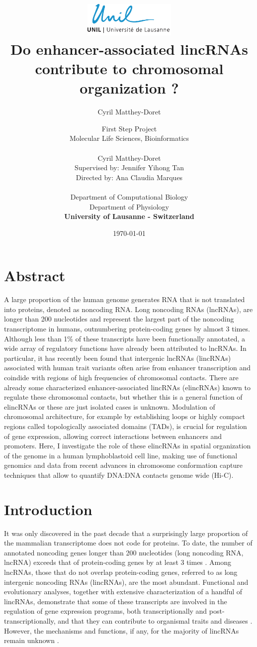 \documentclass[11pt,a4paper]{report}
\author{Cyril Matthey-Doret}
\title{
\includegraphics[width=1.75in]{lo_unil06_bleu.pdf} \\
\vspace*{1in}
\textbf{Do enhancer-associated lincRNAs contribute to chromosomal organization ?}}
\author{\Large{First Step Project}\\
		Molecular Life Sciences, Bioinformatics\\
				\vspace*{0.5in} \\
		Cyril Matthey-Doret\\
        Supervised by: Jennifer Yihong Tan\\
        Directed by: Ana Claudia Marques\\
		\vspace*{0.5in} \\
		Department of Computational Biology\\
		Department of Physiology\\
        \textbf{University of Lausanne - Switzerland}\\
       } \date{\today}
\begin{document}
\renewcommand{\headrulewidth}{1pt}
\maketitle

\section*{Abstract}

A large proportion of the human genome generates RNA that is not translated into proteins, denoted as noncoding RNA. Long noncoding RNAs (lncRNAs), are longer than 200 nucleotides and represent the largest part of the noncoding transcriptome in humans, outnumbering protein-coding genes by almost 3 times. Although less than 1\% of these transcripts have been functionally annotated, a wide array of regulatory functions have already been attributed to lncRNAs. In particular, it has recently been found that intergenic lncRNAs (lincRNAs) associated with human trait variants often arise from enhancer transcription and coindide with regions of high frequencies of chromosomal contacts. There are already some characterized enhancer-associated lincRNAs (elincRNAs) known to regulate these chromosomal contacts, but whether this is a general function of elincRNAs or these are just isolated cases is unknown. Modulation of chromosomal architecture, for example by establishing loops or highly compact regions called topologically associated domains (TADs), is crucial for regulation of gene expression, allowing correct interactions between enhancers and promoters. Here, I investigate the role of these elincRNAs in spatial organization of the genome in a human lymphoblastoid cell line, making use of functional genomics and data from recent advances in chromosome conformation capture techniques that allow to quantify DNA:DNA contacts genome wide (Hi-C).

\section*{Introduction}
It was only discovered in the past decade that a surprisingly large proportion of the mammalian transcriptome does not code for proteins. To date, the number of annotated noncoding genes longer than 200 nucleotides (long noncoding RNA, lncRNA) exceeds that of protein-coding genes by at least 3 times \cite{Iyer2015}⁠. Among lncRNAs, those that do not overlap protein-coding genes, referred to as long intergenic noncoding RNAs (lincRNAs), are the most abundant. Functional and evolutionary analyses, together with extensive characterization of a handful of lincRNAs, demonstrate that some of these transcripts are involved in the regulation of gene expression programs, both transcriptionally and post-transcriptionally, and that they can contribute to organismal traits and diseases \cite{Kornienko2013}⁠. However, the mechanisms and functions, if any, for the majority of lincRNAs remain unknown \cite{Rinn2012}⁠.  
\end{document}
